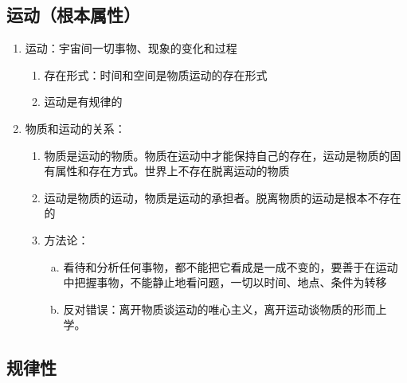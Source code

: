 \documentclass[12pt]{book}
\begin{document}
\subsection{运动（根本属性）}

\begin{enumerate}[1.]
    \item 运动：宇宙间一切事物、现象的变化和过程
          \begin{enumerate}[(1)]
              \item 存在形式：时间和空间是物质运动的存在形式
              \item 运动是有规律的
          \end{enumerate}
    \item 物质和运动的关系：
          \begin{enumerate}[(1)]
              \item 物质是运动的物质。物质在运动中才能保持自己的存在，运动是物质的固有属性和存在方式。世界上不存在脱离运动的物质
              \item 运动是物质的运动，物质是运动的承担者。脱离物质的运动是根本不存在的
              \item 方法论：
                    \begin{enumerate}[a.]
                        \item 看待和分析任何事物，都不能把它看成是一成不变的，要善于在运动中把握事物，不能静止地看问题，一切以时间、地点、条件为转移
                        \item 反对错误：离开物质谈运动的唯心主义，离开运动谈物质的形而上学。
                    \end{enumerate}
          \end{enumerate}
\end{enumerate}


\subsection{规律性}
\end{document}
